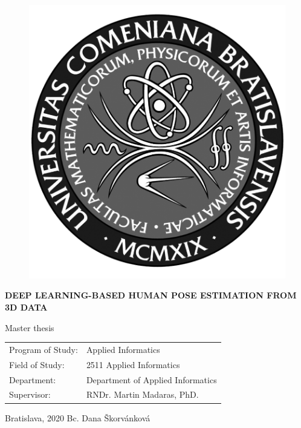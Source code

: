 \documentclass[12pt, a4paper, oneside]{book}
\newcommand\mftitle{Deep Learning-based Human Pose Estimation from 3D Data}
\newcommand\mfthesistype{Master thesis}
\newcommand\mfauthor{Bc. Dana Škorvánková}
\newcommand\mfadvisor{RNDr. Martin Madaras, PhD.}
\newcommand\mfplacedate{Bratislava, 2020}
\begin{document}
\vfill
\begin{figure}[!hbt]
\begin{center}
\includegraphics{images/logo_fmph_dark}
\label{img:logo_dark}
\end{center}
\end{figure}
\begin{center}
\begin{minipage}{0.8\textwidth}
\begin{center}\textbf{\Large\MakeUppercase{\mftitle}}\end{center}
\smallskip
\centerline{\mfthesistype}
\end{minipage}
\end{center}
\vfill
\begin{tabular}{l l}
Program of Study: & Applied Informatics\\
Field of Study: & 2511 Applied Informatics\\
Department: & Department of Applied Informatics\\
Supervisor: & \mfadvisor
\end{tabular}
\vfill
\noindent
\mfplacedate \hfill
\mfauthor
\eject 
\end{document}
